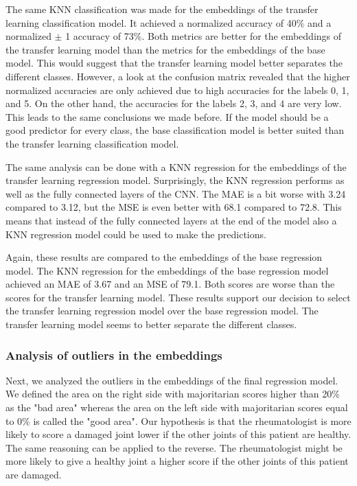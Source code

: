 \documentclass[12pt]{article}
\begin{document}
The same KNN classification was made for the embeddings of the transfer learning classification model. It achieved a normalized accuracy of 40\% and a normalized $\pm$ 1 accuracy of 73\%. Both metrics are better for the embeddings of the transfer learning model than the metrics for the embeddings of the base model. This would suggest that the transfer learning model better separates the different classes. However, a look at the confusion matrix revealed that the higher normalized accuracies are only achieved due to high accuracies for the labels 0, 1, and  5. On the other hand, the accuracies for the labels 2, 3, and 4 are very low. This leads to the same conclusions we made before. If the model should be a good predictor for every class, the base classification model is better suited than the transfer learning classification model.

The same analysis can be done with a KNN regression for the embeddings of the transfer learning regression model. Surprisingly, the KNN regression performs as well as the fully connected layers of the CNN. The MAE is a bit worse with 3.24 compared to 3.12, but the MSE is even better with 68.1 compared to 72.8. This means that instead of the fully connected layers at the end of the model also a KNN regression model could be used to make the predictions.

Again, these results are compared to the embeddings of the base regression model. The KNN regression for the embeddings of the base regression model achieved an MAE of 3.67 and an MSE of 79.1. Both scores are worse than the scores for the transfer learning model. These results support our decision to select the transfer learning regression model over the base regression model. The transfer learning model seems to better separate the different classes.

\subsubsection{Analysis of outliers in the embeddings}
\label{subsubsec:outliers_embeddings}

Next, we analyzed the outliers in the embeddings of the final regression model. We defined the area on the right side with majoritarian scores higher than 20\% as the "bad area" whereas the area on the left side with majoritarian scores equal to 0\% is called the "good area". Our hypothesis is that the rheumatologist is more likely to score a damaged joint lower if the other joints of this patient are healthy. The same reasoning can be applied to the reverse. The rheumatologist might be more likely to give a healthy joint a higher score if the other joints of this patient are damaged.
\end{document}
